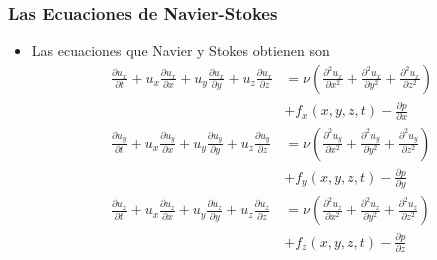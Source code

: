 \documentclass[serif,9pt]{beamer}
\begin{document}
\begin{frame}\frametitle{Las Ecuaciones de Navier-Stokes} 
\begin{itemize}

\item  Las ecuaciones que Navier y Stokes obtienen son \pause
\medskip
\begin{align}
\frac{\partial u_x}{\partial t} + u_x\frac{\partial u_x}{\partial x} + u_y\frac{\partial u_x}{\partial y} + 
u_z\frac{\partial u_x}{\partial z} &= \nu \left(\frac{\partial^2 u_x}{\partial x^2} + \frac{\partial^2 u_x}{\partial y^2} + \frac{\partial^2 u_x}{\partial z^2}\right) \nonumber\\ & + f_x(x,y,z,t) - \frac{\partial p}{\partial x}\label{nsux}\\  \frac{\partial u_y}{\partial t} + u_x\frac{\partial u_y}{\partial x} + u_y\frac{\partial u_y}{\partial y} + 
u_z\frac{\partial u_y}{\partial z} &= \nu \left(\frac{\partial^2 u_y}{\partial x^2} + \frac{\partial^2 u_y}{\partial y^2} + \frac{\partial^2 u_y}{\partial z^2}\right) \nonumber\\ & + f_y(x,y,z,t) - \frac{\partial p}{\partial y} \label{nsuy}\\  
\frac{\partial u_z}{\partial t} + u_x\frac{\partial u_z}{\partial x} + u_y\frac{\partial u_z}{\partial y} + 
u_z\frac{\partial u_z}{\partial z} &= \nu \left(\frac{\partial^2 u_z}{\partial x^2} + \frac{\partial^2 u_z}{\partial y^2} + \frac{\partial^2 u_z}{\partial z^2}\right)\nonumber\\ & + f_z(x,y,z,t) - \frac{\partial p}{\partial z} \label{nsuz} 
\end{align}

\end{itemize}

\end{frame}
\end{document}
